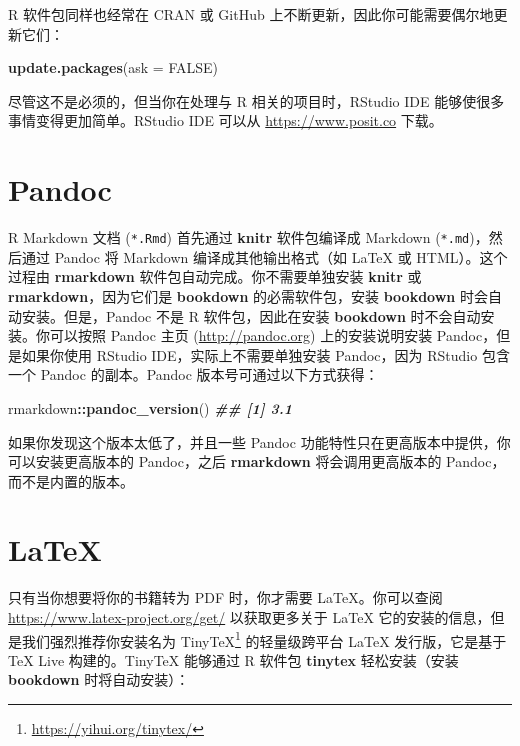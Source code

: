 \documentclass[
  12pt,
]{krantz}
\newenvironment{Shaded}{\begin{snugshade}}{\end{snugshade}}
\newcommand{\AttributeTok}[1]{\textcolor[rgb]{0.13,0.29,0.53}{#1}}
\newcommand{\ConstantTok}[1]{\textcolor[rgb]{0.56,0.35,0.01}{#1}}
\newcommand{\DocumentationTok}[1]{\textcolor[rgb]{0.56,0.35,0.01}{\textbf{\textit{#1}}}}
\newcommand{\FunctionTok}[1]{\textcolor[rgb]{0.13,0.29,0.53}{\textbf{#1}}}
\newcommand{\NormalTok}[1]{#1}
\newcommand{\SpecialCharTok}[1]{\textcolor[rgb]{0.81,0.36,0.00}{\textbf{#1}}}
\renewcommand{\href}[2]{#2\footnote{\url{#1}}}
\theoremstyle{definition}
\theoremstyle{definition}
\theoremstyle{definition}
\theoremstyle{definition}
\theoremstyle{remark}
\begin{document}
R 软件包同样也经常在 CRAN 或 GitHub 上不断更新，因此你可能需要偶尔地更新它们：

\begin{Shaded}
\begin{Highlighting}[]
\FunctionTok{update.packages}\NormalTok{(}\AttributeTok{ask =} \ConstantTok{FALSE}\NormalTok{)}
\end{Highlighting}
\end{Shaded}

尽管这不是必须的，但当你在处理与 R 相关的项目时，RStudio IDE 能够使很多事情变得更加简单。RStudio IDE 可以从 \url{https://www.posit.co} 下载。

\hypertarget{pandoc}{%
\section{Pandoc}\label{pandoc}}

R Markdown 文档 (\texttt{*.Rmd}) 首先通过 \textbf{knitr} 软件包编译成 Markdown (\texttt{*.md})，然后通过 Pandoc 将 Markdown 编译成其他输出格式（如 LaTeX 或 HTML）。这个过程由 \textbf{rmarkdown} 软件包自动完成。你不需要单独安装 \textbf{knitr} 或 \textbf{rmarkdown}，因为它们是 \textbf{bookdown} 的必需软件包，安装 \textbf{bookdown} 时会自动安装。但是，Pandoc 不是 R 软件包，因此在安装 \textbf{bookdown} 时不会自动安装。你可以按照 Pandoc 主页 (\url{http://pandoc.org}) 上的安装说明安装 Pandoc，但是如果你使用 RStudio IDE，实际上不需要单独安装 Pandoc，因为 RStudio 包含一个 Pandoc 的副本。Pandoc 版本号可通过以下方式获得：

\begin{Shaded}
\begin{Highlighting}[]
\NormalTok{rmarkdown}\SpecialCharTok{::}\FunctionTok{pandoc\_version}\NormalTok{()}
\DocumentationTok{\#\# [1] \textquotesingle{}3.1\textquotesingle{}}
\end{Highlighting}
\end{Shaded}

如果你发现这个版本太低了，并且一些 Pandoc 功能特性只在更高版本中提供，你可以安装更高版本的 Pandoc，之后 \textbf{rmarkdown} 将会调用更高版本的 Pandoc，而不是内置的版本。

\hypertarget{latex}{%
\section{LaTeX}\label{latex}}

只有当你想要将你的书籍转为 PDF 时，你才需要 LaTeX。你可以查阅 \url{https://www.latex-project.org/get/} 以获取更多关于 LaTeX 它的安装的信息，但是我们强烈推荐你安装名为 \href{https://yihui.org/tinytex/}{TinyTeX} 的轻量级跨平台 LaTeX 发行版，它是基于 TeX Live 构建的。TinyTeX 能够通过 R 软件包 \textbf{tinytex} 轻松安装（安装 \textbf{bookdown} 时将自动安装）：
\end{document}
